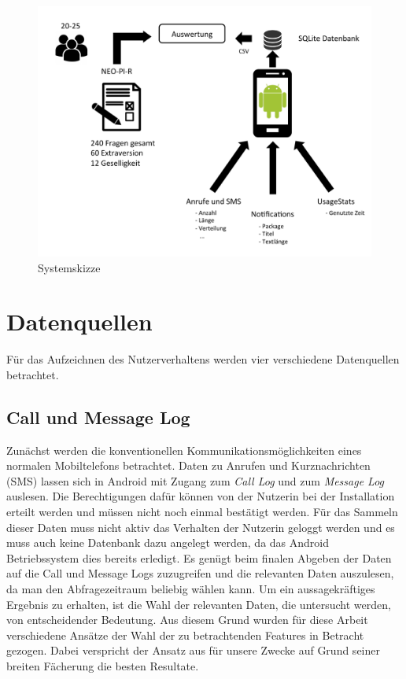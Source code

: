 \par

\begin{figure}[h]
    \centering
    \includegraphics[width=\textwidth]{images/skizze.pdf}
    \caption{Systemskizze}
    \label{skizze}
\end{figure}


\section{Datenquellen}

Für das Aufzeichnen des Nutzerverhaltens werden vier verschiedene Datenquellen betrachtet.
\par

\subsection{Call und Message Log}
Zunächst werden die konventionellen Kommunikationsmöglichkeiten eines normalen Mobiltelefons betrachtet.
Daten zu Anrufen und Kurznachrichten (SMS) lassen sich in Android mit Zugang zum \emph{Call Log} und zum \emph{Message Log} auslesen.
Die Berechtigungen dafür können von der Nutzerin bei der Installation erteilt werden und müssen nicht noch einmal bestätigt werden.
Für das Sammeln dieser Daten muss nicht aktiv das Verhalten der Nutzerin geloggt werden und es muss auch keine Datenbank dazu angelegt werden,
da das Android Betriebssystem dies bereits erledigt.
Es genügt beim finalen Abgeben der Daten auf die Call und Message Logs zuzugreifen und die relevanten Daten auszulesen, da man den Abfragezeitraum beliebig wählen kann.
Um ein aussagekräftiges Ergebnis zu erhalten, ist die Wahl der relevanten Daten, die untersucht werden, von entscheidender Bedeutung. 
Aus diesem Grund wurden für diese Arbeit verschiedene Ansätze der Wahl der zu betrachtenden Features in Betracht gezogen. 
Dabei verspricht der Ansatz aus \cite{chittaranjan2011s} für unsere Zwecke auf Grund seiner breiten Fächerung die besten Resultate.
\par

